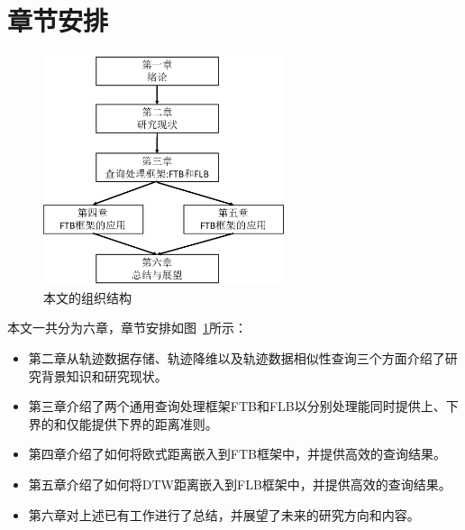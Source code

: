 \section{章节安排}
\begin{figure}
	\centering
	\includegraphics[width=0.63\textwidth]{Fig/chapter1/paperStructure}
	\caption{本文的组织结构}
	\label{fig-chapter1-structure}
\end{figure}
本文一共分为六章，章节安排如图~\ref{fig-chapter1-structure}所示：
\begin{itemize}
	\item 第二章从轨迹数据存储、轨迹降维以及轨迹数据相似性查询三个方面介绍了研究背景知识和研究现状。
	\item 第三章介绍了两个通用查询处理框架FTB和FLB以分别处理能同时提供上、下界的和仅能提供下界的距离准则。
	\item 第四章介绍了如何将欧式距离嵌入到FTB框架中，并提供高效的查询结果。
	\item 第五章介绍了如何将DTW距离嵌入到FLB框架中，并提供高效的查询结果。
	\item 第六章对上述已有工作进行了总结，并展望了未来的研究方向和内容。
\end{itemize}

\clearpage
\phantom{s}
\clearpage